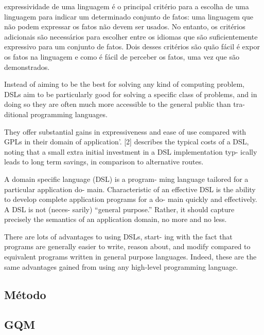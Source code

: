 expressividade de uma linguagem é o principal critério para a escolha de uma
linguagem para indicar um determinado conjunto de fatos: uma linguagem que não
podem expressar os fatos não devem ser usados. No entanto, os critérios
adicionais são necessários para escolher entre os idiomas que são
suficientemente expressivo para um conjunto de fatos. Dois desses critérios são
quão fácil é expor os fatos na linguagem e como é fácil de perceber os fatos,
uma vez que são demonstrados.

\cite{mackinlay1985expressiveness}



Instead of aiming to be the best for solving any kind of
computing problem, DSLs aim to be particularly good for
solving a specific class of problems, and in doing so they
are often much more accessible to the general public than tra-
ditional programming languages.
\cite{taha2008domain}

They offer substantial gains in expressiveness and ease of use compared
with GPLs in their domain of application’. [2] describes the typical costs of a
DSL, noting that a small extra initial investment in a DSL implementation typ-
ically leads to long term savings, in comparison to alternative routes.
\cite{tratt2008evolving}

A domain specific language (DSL) is a program-
ming language tailored for a particular application do-
main. Characteristic of an effective DSL is the ability
to develop complete application programs for a do-
main quickly and effectively. A DSL is not (neces-
sarily) “general purpose.” Rather, it should capture
precisely the semantics of an application domain, no
more and no less.

There are lots of advantages to using DSLs, start-
ing with the fact that programs are generally easier to
write, reason about, and modify compared to equivalent 
programs written in general purpose languages.
Indeed, these are the same advantages gained from using any high-level
programming language.
\cite{hudak1998modular}




\subsection{Método}
\vspace{-6mm}

\subsection{GQM}
\vspace{-6mm}

